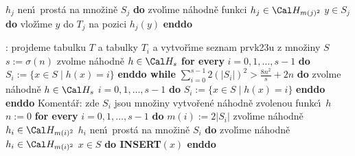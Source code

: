 \documentclass[a4paper,12pt]{article}
\begin{document}
\phantom{------------}{\bf while} $h_j$ nen\'\i\ prost\'a na mno\v zin\v e $
S_j$ {\bf do}\newline 
\phantom{---------------}zvol\'\i me n\'ahodn\v e funkci $
h_j\in \Cal H_{m(j)^2}$\newline 
\phantom{------------}{\bf enddo}\newline 
\phantom{------------}{\bf for every} $y\in S_j$ {\bf do} vlo\v z\'\i me $
y$ do $T_j$ na pozici $h_j(y)$ {\bf enddo}\newline 
\phantom{---------}{\bf endif}\newline 
\phantom{------}{\bf endif}\newline 
\phantom{---}{\bf else}\newline 
\phantom{------}{\bf RehashAll}\newline 
\phantom{---}{\bf endif\newline 
endif}
\bigskip

:\newline 
projdeme tabulku $T$ a tabulky $T_i$ a vytvo\v r\'\i me seznam 
prvk\accent23u z mno\v ziny $S$\newline 
$s:=\sigma(n)$\newline 
zvolme n\'ahodn\v e $h\in \Cal H_s$ \newline 
{\bf for every} $i=0,1,\dots,s-1$ {\bf do} $S_i:=\{x\in 
S\mid h(x)=i\}$ {\bf enddo\newline 
while} $\sum_{i=0}^{s-1}2(|S_i|)^2>\frac {8n^2}s+2n$ {\bf do}\newline 
\phantom{---}zvolme n\'ahodn\v e $h\in \Cal H_s$ \newline 
\phantom{---}{\bf for every} $i=0,1,\dots,s-1$ {\bf do} $
S_i:=\{x\in S\mid h(x)=i\}$ {\bf enddo}\newline 
{\bf enddo}\newline
Koment\'a\v r: zde $S_i$ jsou mno\v ziny vytvo\v ren\'e n\'ahodn\v e zvolenou 
funkc\'\i\ $h$ \newline 
$n:=0$ \newline 
{\bf for every} $i=0,1,\dots,s-1$ {\bf do}\newline 
\phantom{---}$m(i):=2|S_i|$\newline 
\phantom{---}zvol\'\i me n\'ahodn\v e $h_i\in \Cal H_{m(i
)^2}$\newline 
\phantom{---}{\bf while} $h_i$ nen\'\i\ prost\'a na mno\v zin\v e $
S_i$ {\bf do}\newline 
\phantom{------}zvol\'\i me n\'ahodn\v e $h_i\in \Cal H_{m(i)^2}$\newline 
\phantom{---}{\bf enddo\newline 
enddo\newline 
for every} $x\in S$ {\bf do INSERT$(x)$ enddo}
\bigskip
\end{document}
